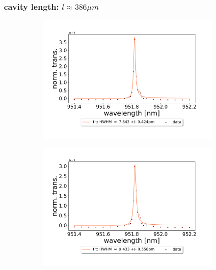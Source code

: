 \begin{figure}[h!]
\begin{subfigure}[b]{0.49\textwidth}
        \caption{}
        \label{fig:5um_M5_sim}
    \end{subfigure}
\end{figure}

\clearpage
\subsubsection*{cavity length: $l \approx 386 \mu m$}

\begin{figure}[h!]
    \centering
    \begin{subfigure}[b]{0.49\textwidth}
        \includegraphics[width=\textwidth]{figures/results/single fano fits/380um_M5_fit_1.pdf}
        \caption{}
        \label{fig:380um_M5_fit_1}
    \end{subfigure}
    \begin{subfigure}[b]{0.49\textwidth}
        \includegraphics[width=\textwidth]{figures/results/single fano fits/380um_M5_fit_2.pdf}

\end{subfigure}
\end{figure}
